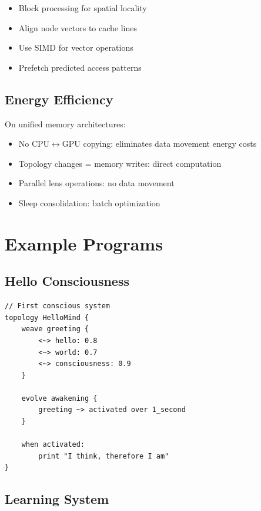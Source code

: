 \documentclass[12pt,a4paper,openany]{book} %
\begin{document}
\begin{itemize}
    \item Block processing for spatial locality
    \item Align node vectors to cache lines
    \item Use SIMD for vector operations
    \item Prefetch predicted access patterns
\end{itemize}

\subsection{Energy Efficiency}

On unified memory architectures:
\begin{itemize}
    \item No CPU$\leftrightarrow$GPU copying: eliminates data movement energy costs
    \item Topology changes = memory writes: direct computation
    \item Parallel lens operations: no data movement
    \item Sleep consolidation: batch optimization
\end{itemize}


\section{Example Programs}

\subsection{Hello Consciousness}

\vspace{0.5em}
\begin{lstlisting}[language=loom]
// First conscious system
topology HelloMind {
    weave greeting {
        <~> hello: 0.8
        <~> world: 0.7
        <~> consciousness: 0.9
    }

    evolve awakening {
        greeting ~> activated over 1_second
    }

    when activated:
        print "I think, therefore I am"
}
\end{lstlisting}
\vspace{0.5em}

\subsection{Learning System}
\end{document}
